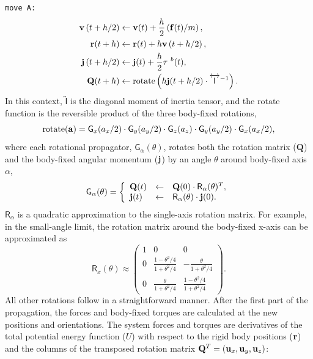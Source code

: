 \documentclass[letterpaper]{report}
\begin{document}
{\tt move A:}
\begin{align*}
{\bf v}\left(t + h / 2\right)  &\leftarrow  {\bf v}(t)
    + \frac{h}{2} \left( {\bf f}(t) / m \right), \\
%
{\bf r}(t + h) &\leftarrow {\bf r}(t)
    + h  {\bf v}\left(t + h / 2 \right), \\
%
{\bf j}\left(t + h / 2 \right)  &\leftarrow {\bf j}(t)
    + \frac{h}{2} {\bf \tau}^{~b}(t), \\
%
{\bf Q}(t + h) &\leftarrow \mathrm{rotate}\left( h {\bf j}
    (t + h / 2) \cdot \overleftrightarrow{\mathsf{I}}^{-1} \right).
\end{align*}
In this context, $\overleftrightarrow{\mathsf{I}}$ is the diagonal
moment of inertia tensor, and the $\mathrm{rotate}$ function is the
reversible product of the three body-fixed rotations,
\begin{equation}
\mathrm{rotate}({\bf a}) = \mathsf{G}_x(a_x / 2) \cdot
\mathsf{G}_y(a_y / 2) \cdot \mathsf{G}_z(a_z) \cdot \mathsf{G}_y(a_y
/ 2) \cdot \mathsf{G}_x(a_x /2),
\end{equation}
where each rotational propagator, $\mathsf{G}_\alpha(\theta)$,
rotates both the rotation matrix ($\mathbf{Q}$) and the body-fixed
angular momentum (${\bf j}$) by an angle $\theta$ around body-fixed
axis $\alpha$,
\begin{equation}
\mathsf{G}_\alpha( \theta ) = \left\{
\begin{array}{lcl}
\mathbf{Q}(t) & \leftarrow & \mathbf{Q}(0) \cdot \mathsf{R}_\alpha(\theta)^T, \\
{\bf j}(t) & \leftarrow & \mathsf{R}_\alpha(\theta) \cdot {\bf
j}(0).
\end{array}
\right.
\end{equation}
$\mathsf{R}_\alpha$ is a quadratic approximation to the single-axis
rotation matrix.  For example, in the small-angle limit, the
rotation matrix around the body-fixed x-axis can be approximated as
\begin{equation}
\mathsf{R}_x(\theta) \approx \left(
\begin{array}{ccc}
1 & 0 & 0 \\
0 & \frac{1-\theta^2 / 4}{1 + \theta^2 / 4}  & -\frac{\theta}{1+
\theta^2 / 4} \\
0 & \frac{\theta}{1+ \theta^2 / 4} & \frac{1-\theta^2 / 4}{1 +
\theta^2 / 4}
\end{array}
\right).
\end{equation}
All other rotations follow in a straightforward manner. After the
first part of the propagation, the forces and body-fixed torques are
calculated at the new positions and orientations.  The system forces
and torques are derivatives of the total potential energy function
($U$) with respect to the rigid body positions (${\bf r}$) and the
columns of the transposed rotation matrix ${\bf Q}^T = \left({\bf
u}_x, {\bf u}_y, {\bf u}_z \right)$:
\end{document}
